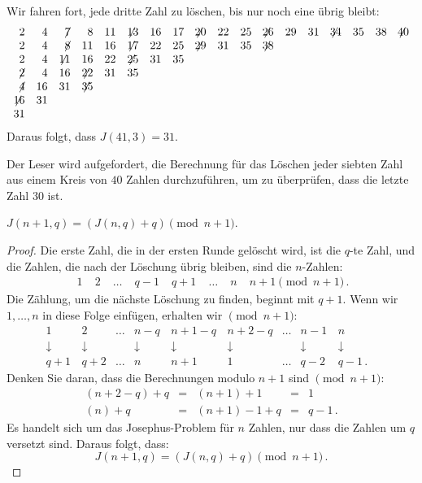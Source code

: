 \begin{example}
\[\begin{array}{rrrrrrrrrrrrrrrrrrrrrrrrrrrr}
\end{array}
\]
Wir fahren fort, jede dritte Zahl zu löschen, bis nur noch eine übrig bleibt:
\[
\begin{array}{rrrrrrrrrrrrrrrrrr}
2&4&\not\!7&8&11&\not\!\!13&16&17&\not\!\!20&22&25&\not\!\!26&29&31&\not\!\!34&35&38&\not\!\!40
\\
2&4&\not\!8&11&16&\not\!\!17&22&25&\not\!\!29&31&35&\not\!\!38
\\
2&4&\not\!\!11&16&22&\not\!\!25&31&35
\\
\not\!2&4&16&\not\!\!22&31&35
\\
\not\!4&16&31&\not\!\!35
\\
\not\!\!16&31
\\
31
\end{array}
\]
Daraus folgt, dass $J(41,3)=31$.
\end{example}

Der Leser wird aufgefordert, die Berechnung für das Löschen jeder siebten Zahl aus einem Kreis von $40$ Zahlen durchzuführen, um zu überprüfen, dass die letzte Zahl $30$ ist.

\begin{theorem}\label{thm.jo1}
$J(n+1,q)=(J(n,q)+q) \pmod {n+1}$.
\end{theorem}

\begin{proof}
Die erste Zahl, die in der ersten Runde gelöscht wird, ist die $q$-te Zahl, und die Zahlen, die nach der Löschung übrig bleiben, sind die $n$-Zahlen:
\[
\begin{array}{rrrrrrrr}
\;1&\;2&\;\ldots&\;q-1&\;q+1&\;\ldots&\;n&\;n+1 \pmod {n+1}\,.
\end{array}
\]
Die Zählung, um die nächste Löschung zu finden, beginnt mit $q+1$. Wenn wir $1,\ldots,n$ in diese Folge einfügen, erhalten wir $\pmod {n\!+\!1}$:
\[
\begin{array}{cccccccccc}
1&\, 2&\ldots& n-q&\, n+1-q&\, n+2-q&\ldots&n-1&\, n&\\
\downarrow&\, \downarrow&&\downarrow&\, \downarrow&\, \downarrow&&\downarrow&\, \downarrow\\
q+1&\, q+2&\ldots&n&\, n+1&\, 1&\ldots&q-2&\, q-1\,.
\end{array}
\]
Denken Sie daran, dass die Berechnungen modulo $n+1$ sind $\pmod {n\!+\!1}$:
\[
\begin{array}{lclcl}
(n+2-q)+q&=& (n+1)+1&=& 1\\
(n)+q&= &(n+1)-1+q&= &q-1\,.
\end{array}
\]
Es handelt sich um das Josephus-Problem für $n$ Zahlen, nur dass die Zahlen um $q$ versetzt sind. Daraus folgt, dass:
\[
J(n+1,q)=(J(n,q)+q) \pmod {n+1}\,.
\]
\end{proof}

